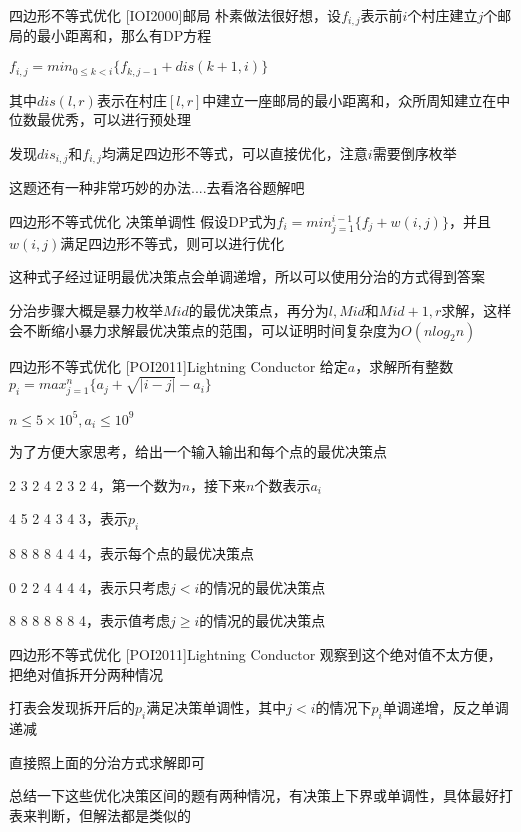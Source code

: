 \documentclass[9pt]{beamer}
\begin{document}
  \begin{frame}{四边形不等式优化 [IOI2000]邮局}
     朴素做法很好想，设$f_{i,j}$表示前$i$个村庄建立$j$个邮局的最小距离和，那么有DP方程

     $f_{i,j}=min_{0\le k<i}\{f_{k,j-1}+dis(k+1,i)\}$

     其中$dis(l,r)$表示在村庄$[l,r]$中建立一座邮局的最小距离和，众所周知建立在中位数最优秀，可以进行预处理

     发现$dis_{i,j}$和$f_{i,j}$均满足四边形不等式，可以直接优化，注意$i$需要倒序枚举

     这题还有一种非常巧妙的办法....去看洛谷题解吧
  \end{frame}

  \begin{frame}{四边形不等式优化 决策单调性}
     假设DP式为$f_i=min_{j=1}^{i-1}\{f_j+w(i,j)\}$，并且$w(i,j)$满足四边形不等式，则可以进行优化
    
     这种式子经过证明最优决策点会单调递增，所以可以使用分治的方式得到答案
    
     分治步骤大概是暴力枚举$Mid$的最优决策点，再分为$l,Mid$和$Mid+1,r$求解，这样会不断缩小暴力求解最优决策点的范围，可以证明时间复杂度为$O(nlog_2n)$
  \end{frame}

  \begin{frame}{四边形不等式优化 [POI2011]Lightning Conductor}
     给定$a$，求解所有整数$p_i=max_{j=1}^n\{a_j+\sqrt{|i-j|}-a_i\}$

     $n\le 5\times 10^5,a_i\le 10^9$

     为了方便大家思考，给出一个输入输出和每个点的最优决策点

     2 3 2 4 2 3 2 4，第一个数为$n$，接下来$n$个数表示$a_i$
    
     4 5 2 4 3 4 3，表示$p_i$

     8 8 8 8 4 4 4，表示每个点的最优决策点

     0 2 2 4 4 4 4，表示只考虑$j<i$的情况的最优决策点

     8 8 8 8 8 8 4，表示值考虑$j\ge i$的情况的最优决策点
  \end{frame}

  \begin{frame}{四边形不等式优化 [POI2011]Lightning Conductor}
     观察到这个绝对值不太方便，把绝对值拆开分两种情况
    
     打表会发现拆开后的$p_i$满足决策单调性，其中$j<i$的情况下$p_i$单调递增，反之单调递减

     直接照上面的分治方式求解即可

     总结一下这些优化决策区间的题有两种情况，有决策上下界或单调性，具体最好打表来判断，但解法都是类似的
  \end{frame}
\end{document}
